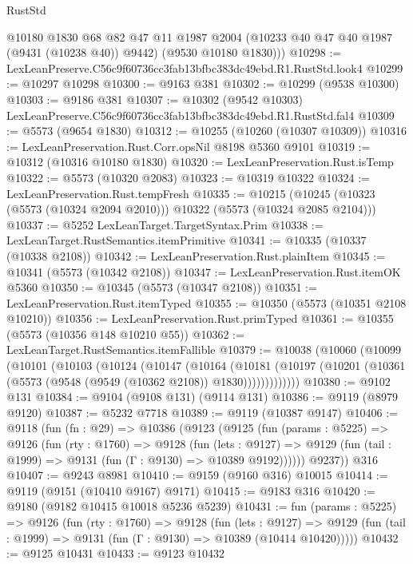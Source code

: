 \begin{lexlean}{RustStd}
\begin{coremodule}
        @10180
        @1830
        @68
        @82
        @47
        @11
        @1987
        @2004
        (@10233 @40 @47 @40 @1987 (@9431 (@10238 @40)) @9442)
        (@9530 @10180 @1830)))
@10298 := LexLeanPreserve.C56c9f60736cc3fab13bfbc383dc49ebd.R1.RustStd.look4
@10299 := @10297 @10298
@10300 := @9163 @381
@10302 := @10299 (@9538 @10300)
@10303 := @9186 @381
@10307 := @10302 (@9542 @10303) LexLeanPreserve.C56c9f60736cc3fab13bfbc383dc49ebd.R1.RustStd.fal4
@10309 := @5573 (@9654 @1830)
@10312 := @10255 (@10260 (@10307 @10309))
@10316 := LexLeanPreservation.Rust.Corr.opsNil @8198 @5360 @9101
@10319 := @10312 (@10316 @10180 @1830)
@10320 := LexLeanPreservation.Rust.isTemp
@10322 := @5573 (@10320 @2083)
@10323 := @10319 @10322
@10324 := LexLeanPreservation.Rust.tempFresh
@10335 := @10215 (@10245 (@10323 (@5573 (@10324 @2094 @2010))) @10322 (@5573 (@10324 @2085 @2104)))
@10337 := @5252 LexLeanTarget.TargetSyntax.Prim
@10338 := LexLeanTarget.RustSemantics.itemPrimitive
@10341 := @10335 (@10337 (@10338 @2108))
@10342 := LexLeanPreservation.Rust.plainItem
@10345 := @10341 (@5573 (@10342 @2108))
@10347 := LexLeanPreservation.Rust.itemOK @5360
@10350 := @10345 (@5573 (@10347 @2108))
@10351 := LexLeanPreservation.Rust.itemTyped
@10355 := @10350 (@5573 (@10351 @2108 @10210))
@10356 := LexLeanPreservation.Rust.primTyped
@10361 := @10355 (@5573 (@10356 @148 @10210 @55))
@10362 := LexLeanTarget.RustSemantics.itemFallible
@10379 := @10038
    (@10060
      (@10099
        (@10101
          (@10103
            (@10124
              (@10147
                (@10164
                  (@10181
                    (@10197 (@10201 (@10361 (@5573 (@9548 (@9549 (@10362 @2108)) @1830)))))))))))))
@10380 := @9102 @131
@10384 := @9104 (@9108 @131) (@9114 @131)
@10386 := @9119 (@8979 @9120)
@10387 := @5232 @7718
@10389 := @9119 (@10387 @9147)
@10406 := @9118
    (fun (fn : @29) =>
    @10386
      (@9123
        (@9125
          (fun (params : @5225) =>
          @9126
            (fun (rty : @1760) =>
            @9128
              (fun (lets : @9127) =>
              @9129 (fun (tail : @1999) => @9131 (fun (Γ : @9130) => @10389 @9192))))))
        @9237))
    @316
@10407 := @9243 @8981
@10410 := @9159 (@9160 @316) @10015
@10414 := @9119 (@9151 (@10410 @9167) @9171)
@10415 := @9183 @316
@10420 := @9180 (@9182 @10415 @10018 @5236 @5239)
@10431 := fun (params : @5225) =>
  @9126
    (fun (rty : @1760) =>
    @9128
      (fun (lets : @9127) =>
      @9129 (fun (tail : @1999) => @9131 (fun (Γ : @9130) => @10389 (@10414 @10420)))))
@10432 := @9125 @10431
@10433 := @9123 @10432

\end{coremodule}
\end{lexlean}
